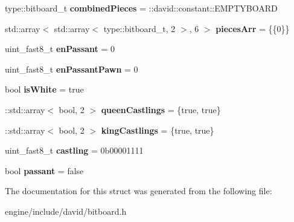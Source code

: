 \begin{DoxyCompactItemize}
type\+::bitboard\+\_\+t {\bfseries combined\+Pieces} = \+::david\+::constant\+::\+E\+M\+P\+T\+Y\+B\+O\+A\+RD
\item 
\mbox{\label{structdavid_1_1bitboard_1_1gameState_a44f88cee60f9f37133a4d68a1c0ac4f6}} 
std\+::array$<$ std\+::array$<$ type\+::bitboard\+\_\+t, 2 $>$, 6 $>$ {\bfseries pieces\+Arr} = \{\{0\}\}
\item 
\mbox{\label{structdavid_1_1bitboard_1_1gameState_aa737d1bf9709d497c69b38c91821f83b}} 
uint\+\_\+fast8\+\_\+t {\bfseries en\+Passant} = 0
\item 
\mbox{\label{structdavid_1_1bitboard_1_1gameState_ab09cb7e0a1697d1b260e6ae69a7aea7d}} 
uint\+\_\+fast8\+\_\+t {\bfseries en\+Passant\+Pawn} = 0
\item 
\mbox{\label{structdavid_1_1bitboard_1_1gameState_aeaaaea3c36fd699d80a14889946a7f5d}} 
bool {\bfseries is\+White} = true
\item 
\mbox{\label{structdavid_1_1bitboard_1_1gameState_a7113f8a066d79f949ee0c62dbd9cdbab}} 
\+::std\+::array$<$ bool, 2 $>$ {\bfseries queen\+Castlings} = \{true, true\}
\item 
\mbox{\label{structdavid_1_1bitboard_1_1gameState_a094824fa1e583fabd917dceba7d7cec8}} 
\+::std\+::array$<$ bool, 2 $>$ {\bfseries king\+Castlings} = \{true, true\}
\item 
\mbox{\label{structdavid_1_1bitboard_1_1gameState_a4fb6e8e6f32b8a7285e60ea06528ceac}} 
uint\+\_\+fast8\+\_\+t {\bfseries castling} = 0b00001111
\item 
\mbox{\label{structdavid_1_1bitboard_1_1gameState_aa284ca726db224308bb08b7a7ffa8321}} 
bool {\bfseries passant} = false
\end{DoxyCompactItemize}


The documentation for this struct was generated from the following file\+:\begin{DoxyCompactItemize}
\item 
engine/include/david/bitboard.\+h\end{DoxyCompactItemize}

